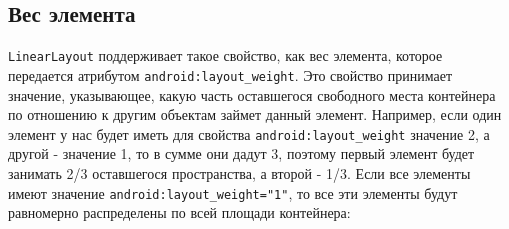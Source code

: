 \subsection{Вес элемента}
\texttt{LinearLayout} поддерживает такое свойство, как вес элемента, которое
передается атрибутом \texttt{android:layout\_weight}.
Это свойство принимает
значение, указывающее, какую часть оставшегося свободного места
контейнера по отношению к другим объектам займет данный элемент.
Например, если один элемент у нас будет иметь для свойства
\texttt{android:layout\_weight} значение 2, а другой - значение 1, то в сумме они дадут
3, поэтому первый элемент будет занимать 2/3 оставшегося пространства, а
второй - 1/3.
Если все элементы имеют значение \texttt{android:layout\_weight="1"}, то все эти
элементы будут равномерно распределены по всей площади контейнера: